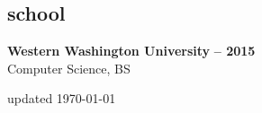 \documentclass[margin,10pt]{res}
\begin{document}
\begin{resume}
\section{\sc \lsstyle school}
    \textbf{Western Washington University} \hfill \textsc{\bfseries{} -- 2015}\\
    Computer Science, BS

\end{resume}
\begin{minipage}[t]{\textwidth}
    \flushright
    \small
    \sc \lsstyle
    \hfill updated \today
\end{minipage}
\end{document}
